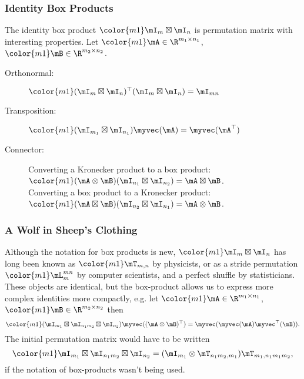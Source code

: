 \begin{frame}
\frametitle{Identity Box Products}
The identity box product $\color{m1}\mI_m\boxtimes\mI_n$ is
permutation matrix with interesting properties.  Let
$\color{m1}\mA\in\R^{m_1\times n_1}$, $\color{m1}\mB\in\R^{m_2\times
  n_2}$.
\begin{description}
\item[Orthonormal:]
$\color{m1}(\mI_m\boxtimes\mI_n)^\top(\mI_m\boxtimes\mI_n)=\mI_{mn}$
\item[Transposition:]
$\color{m1}(\mI_{m_1}\boxtimes\mI_{n_1})\myvec(\mA) = \myvec(\mA^\top)$
\item[Connector:]
Converting a Kronecker product to a box product:
$\color{m1}(\mA\otimes\mB)(\mI_{n_1}\boxtimes\mI_{n_2}) =
\mA\boxtimes\mB$.\\
Converting a box product to a Kronecker product:
$\color{m1}(\mA\boxtimes\mB)(\mI_{n_2}\boxtimes\mI_{n_1}) =
\mA\otimes\mB$.
\end{description}
\end{frame}
\begin{frame}
\frametitle{A Wolf in Sheep's Clothing}
Although the notation for box products is new,
$\color{m1}\mI_m\boxtimes\mI_n$ has long been known as
$\color{m1}\mT_{m,n}$ by physicists, or as a \alert{stride
  permutation} $\color{m1}\mL_m^{mn}$ by computer scientists, and a
\alert{perfect shuffle} by statisticians.  These objects are
identical, but the box-product allows us to express more complex
identities more compactly, e.g. let $\color{m1}\mA\in\R^{m_1\times
  n_1}$, $\color{m1}\mB\in\R^{m_2\times n_2}$ then
$$\color{m1}
(\mI_{m_1}\boxtimes\mI_{n_1m_2}\boxtimes\mI_{n_2})\myvec((\mA\otimes\mB)^\top)=\myvec(\myvec(\mA)\myvec^\top(\mB)).
$$
The initial permutation matrix would have to be written 
$$\color{m1}
\mI_{m_1}\boxtimes\mI_{n_1m_2}\boxtimes\mI_{n_2} = (\mI_{m_1}\otimes\mT_{n_1m_2,m_1})\mT_{m_1,n_1m_1m_2},
$$
if the notation of box-products wasn't being used.  
\end{frame}

